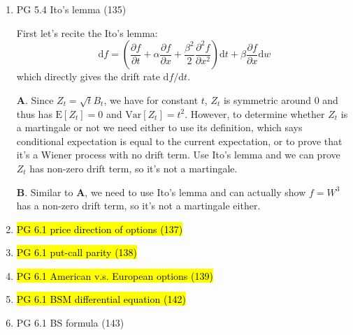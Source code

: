 \documentclass[10pt]{article}
\newcommand{\E}{\text{E}}
\newcommand{\Var}{\text{Var}}
\renewcommand{\P}{\text{P}}
\renewcommand{\d}{\text{d}}
\newenvironment{note}{\begin{enumerate}[leftmargin=1em,topsep=0pt,noitemsep]}{\end{enumerate}}
\newcommand{\solution}{\boxed{\textbf{SOLUTION}}\hspace{.5em}}
\begin{document}
\begin{spacing}{1.1}
\begin{note}
      \textbf{C}. Assume the probability of hitting $3$ first is $\P_3$, then since $B_T$ is a martingale for $T$ being the first passage time, we know $3\P_3 + (-5)(1- \P_3)=0$ which gives $\P_3 = 5/8$. Generally, we have $\P_{\alpha}=\alpha/(\alpha + \beta)$. For $B_t=W_t+mt$, since $\exp(\lambda W_t + \lambda^2t/2)$ is a martingale (see exponential martingale), we know $X_t = \exp(\lambda B_t + \lambda^2t/2)$ is also a martingale and thus $\E[X_t]=0$. Notice this holds for any $\lambda$ and thus we can let $\lambda = -2m$, which gives $\E[X_t] = \E[\exp(-2mB_t)]=1$. We know a martingale stopped at the stopping time is also a martingale, i.e. $X_T$ is still a martingale for $T$ being the time first $B_t$ hits $3$ or $-5$, so $\E[X_T] = \E[\exp(-2mB_T)]=\P_3\exp(-2m\cdot 3) + (1-\P_3)\exp(2m\cdot 5) = \P_3\exp(-6m)+(1-\P_3)\exp(10m)=1$. Therefore, we have $\P_3 = \frac{\exp(10m)-1}{\exp(10m)-\exp(-6m)}$.

      \textbf{D}. Again we have $\E[\exp(-2mB_t)]=1$ while here we have $m=1$, and thus $\E[\exp(-2B_t)]=\P_{-1}\exp(2) + (1-\P_{-1})\exp(-\infty)=\exp(2)\P_{-2}=1$. So $\P_{-1}=\exp(-2)$.

\item PG 5.4 Ito's lemma (135) 
      
      \solution First let's recite the Ito's lemma:
      $$
      \d f = \left(\frac{\partial f}{\partial t} + \alpha \frac{\partial f}{\partial x} + \frac{\beta^2}{2}\frac{\partial^2 f}{\partial x^2}\right)\d t + \beta \frac{\partial f}{\partial x}\d w
      $$
      which directly gives the drift rate $\d f / \d t$.

      \textbf{A}. Since $Z_t  = \sqrt{t}B_t$, we have for constant $t$, $Z_t$ is symmetric around $0$ and thus has $\E[Z_t]=0$ and $\Var[Z_t]=t^2$. However, to determine whether $Z_t$ is a martingale or not we need either to use its definition, which says conditional expectation is equal to the current expectation, or to prove that it's a Wiener process with no drift term. Use Ito's lemma and we can prove $Z_t$ has non-zero drift term, so it's not a martingale.

      \textbf{B}. Similar to $\textbf{A}$, we need to use Ito's lemma and can actually show $f=W^3$ has a non-zero drift term, so it's not a martingale either.

\item \hl{PG 6.1 price direction of options (137)}
      
      

\item \hl{PG 6.1 put-call parity (138)}

\item \hl{PG 6.1 American v.s. European options (139)}

\item \hl{PG 6.1 BSM differential equation (142)}

\item PG 6.1 BS formula (143)

\end{note}



\end{spacing}
\end{document}
